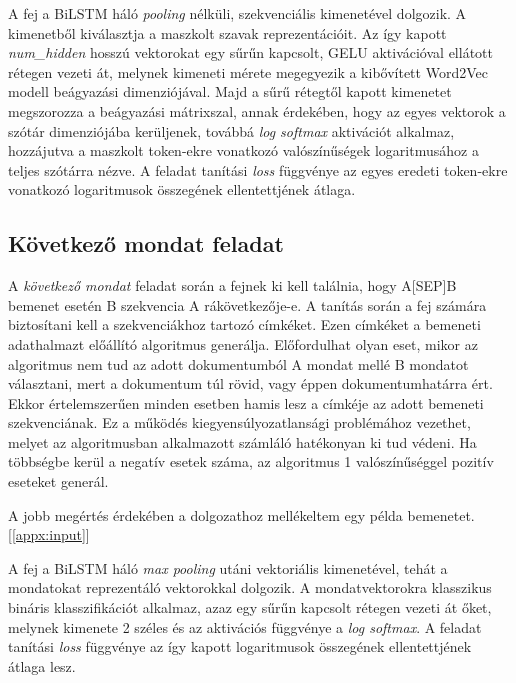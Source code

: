 A fej a BiLSTM háló \textit{pooling} nélküli, szekvenciális kimenetével dolgozik. A kimenetből kiválasztja a maszkolt szavak reprezentációit. Az így kapott \textit{num\_hidden} hosszú vektorokat egy sűrűn kapcsolt, GELU aktivációval \cite{gelu} ellátott rétegen vezeti át, melynek kimeneti mérete megegyezik a kibővített Word2Vec modell beágyazási dimenziójával. Majd a sűrű rétegtől kapott kimenetet megszorozza a beágyazási mátrixszal, annak érdekében, hogy az egyes vektorok a szótár dimenziójába kerüljenek, továbbá \textit{log softmax} aktivációt alkalmaz, hozzájutva a maszkolt token-ekre vonatkozó valószínűségek logaritmusához a teljes szótárra nézve. A feladat tanítási \textit{loss} függvénye az egyes eredeti token-ekre vonatkozó logaritmusok összegének ellentettjének átlaga.


\subsection{Következő mondat feladat}

A \textit{következő mondat} feladat során a fejnek ki kell találnia, hogy A[SEP]B bemenet esetén B szekvencia A rákövetkezője-e. A tanítás során a fej számára biztosítani kell a szekvenciákhoz tartozó címkéket. Ezen címkéket a bemeneti adathalmazt előállító algoritmus generálja. Előfordulhat olyan eset, mikor az algoritmus nem tud az adott dokumentumból A mondat mellé B mondatot választani, mert a dokumentum túl rövid, vagy éppen dokumentumhatárra ért. Ekkor értelemszerűen minden esetben hamis lesz a címkéje az adott bemeneti szekvenciának. Ez a működés kiegyensúlyozatlansági problémához vezethet, melyet az algoritmusban alkalmazott számláló hatékonyan ki tud védeni. Ha többségbe kerül a negatív esetek száma, az algoritmus 1 valószínűséggel pozitív eseteket generál. 

\begin{note}
	A jobb megértés érdekében a dolgozathoz mellékeltem egy példa bemenetet. [\ref{appx:input}]
\end{note}

A fej a BiLSTM háló \textit{max pooling} utáni vektoriális kimenetével, tehát a mondatokat reprezentáló vektorokkal dolgozik. A mondatvektorokra klasszikus bináris klasszifikációt alkalmaz, azaz egy sűrűn kapcsolt rétegen vezeti át őket, melynek kimenete 2 széles és az aktivációs függvénye a \textit{log softmax}. A feladat tanítási \textit{loss} függvénye az így kapott logaritmusok összegének ellentettjének átlaga lesz.

